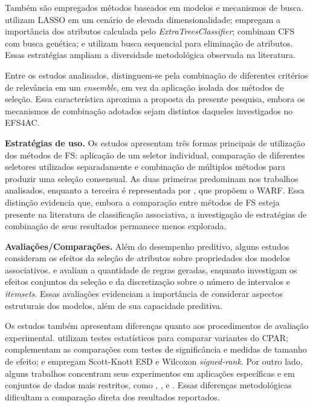 Também são empregados métodos baseados em modelos e mecanismos de busca.  utilizam LASSO em um cenário de elevada dimensionalidade;  empregam a importância dos atributos calculada pelo \textit{ExtraTreesClassifier};  combinam CFS com busca genética; e  utilizam busca sequencial para eliminação de atributos. Essas estratégias ampliam a diversidade metodológica observada na literatura.

Entre os estudos analisados,  distinguem-se pela combinação de diferentes critérios de relevância em um \textit{ensemble}, em vez da aplicação isolada dos métodos de seleção. Essa característica aproxima a proposta da presente pesquisa, embora os mecanismos de combinação adotados sejam distintos daqueles investigados no EFS4AC.

\noindent\textbf{Estratégias de uso.} Os estudos apresentam três formas principais de utilização dos métodos de FS: aplicação de um seletor individual, comparação de diferentes seletores utilizados separadamente e combinação de múltiplos métodos para produzir uma seleção consensual. As duas primeiras predominam nos trabalhos analisados, enquanto a terceira é representada por , que propõem o WARF. Essa distinção evidencia que, embora a comparação entre métodos de FS esteja presente na literatura de classificação associativa, a investigação de estratégias de combinação de seus resultados permanece menos explorada.

\noindent\textbf{Avaliações/Comparações.} Além do desempenho preditivo, alguns estudos consideram os efeitos da seleção de atributos sobre propriedades dos modelos associativos.  e  avaliam a quantidade de regras geradas, enquanto  investigam os efeitos conjuntos da seleção e da discretização sobre o número de intervalos e \textit{itemsets}. Essas avaliações evidenciam a importância de considerar aspectos estruturais dos modelos, além de sua capacidade preditiva.

Os estudos também apresentam diferenças quanto aos procedimentos de avaliação experimental.  utilizam testes estatísticos para comparar variantes do CPAR;  complementam as comparações com testes de significância e medidas de tamanho de efeito; e  empregam Scott-Knott ESD e Wilcoxon \textit{signed-rank}. Por outro lado, alguns trabalhos concentram seus experimentos em aplicações específicas e em conjuntos de dados mais restritos, como , ,  e . Essas diferenças metodológicas dificultam a comparação direta dos resultados reportados.

